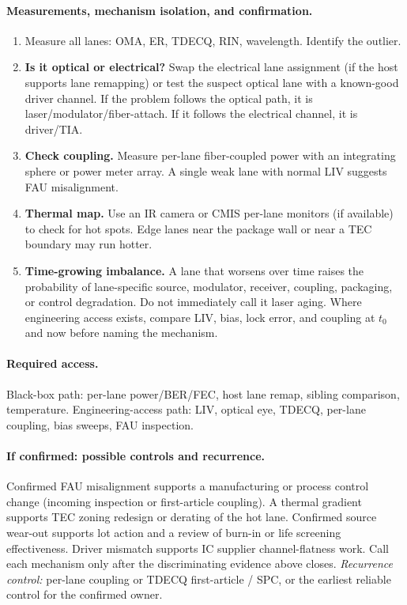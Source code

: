 \paragraph{Measurements, mechanism isolation, and confirmation.}
\begin{enumerate}
\item Measure all lanes: OMA, ER, TDECQ, RIN, wavelength. Identify the outlier.
\item \textbf{Is it optical or electrical?} Swap the electrical lane assignment
      (if the host supports lane remapping) or test the suspect optical lane with a
      known-good driver channel. If the problem follows the optical path, it is
      laser/modulator/fiber-attach. If it follows the electrical channel, it is
      driver/TIA.
\item \textbf{Check coupling.} Measure per-lane fiber-coupled power with an
      integrating sphere or power meter array. A single weak lane with normal LIV
      suggests FAU misalignment.
\item \textbf{Thermal map.} Use an IR camera or CMIS per-lane monitors (if
      available) to check for hot spots. Edge lanes near the package wall or near a
      TEC boundary may run hotter.
\item \textbf{Time-growing imbalance.} A lane that worsens over time raises the
      probability of lane-specific source, modulator, receiver, coupling,
      packaging, or control degradation. Do not immediately call it laser aging.
      Where engineering access exists, compare LIV, bias, lock error, and coupling
      at $t_0$ and now before naming the mechanism.
\end{enumerate}

\paragraph{Required access.}
Black-box path: per-lane power/BER/FEC, host lane remap, sibling comparison,
temperature. Engineering-access path: LIV, optical eye, TDECQ, per-lane coupling,
bias sweeps, FAU inspection.

\paragraph{If confirmed: possible controls and recurrence.}
Confirmed FAU misalignment supports a manufacturing or process control change
(incoming inspection or first-article coupling). A thermal gradient supports TEC
zoning redesign or derating of the hot lane. Confirmed source wear-out supports
lot action and a review of burn-in or life screening effectiveness. Driver
mismatch supports IC supplier channel-flatness work. Call each mechanism only
after the discriminating evidence above closes.
\emph{Recurrence control:} per-lane coupling or TDECQ first-article / SPC, or the
earliest reliable control for the confirmed owner.

